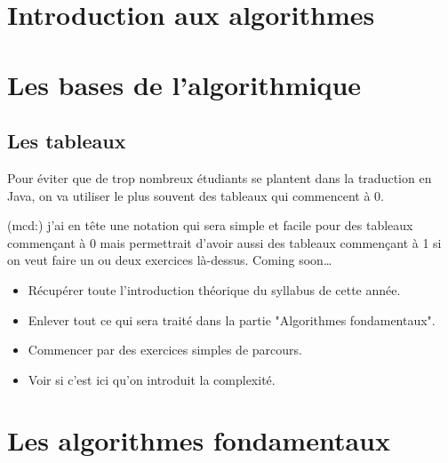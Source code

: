 \documentclass[a4paper,doubleside]{book}
\begin{document}

	
	
	

	\part{Introduction aux algorithmes}	
		
		
		

	\part{Les bases de l'algorithmique}
		
		
		
		
		
		\chapter{Les tableaux}
			\begin{Note}
				Pour éviter que de trop nombreux étudiants
				se plantent dans la traduction en Java,
				on va utiliser le plus souvent des tableaux
				qui commencent à 0.
				
				(mcd:) j'ai en tête une notation qui sera simple
				et facile pour des tableaux commençant à 0
				mais permettrait d'avoir aussi des tableaux
				commençant à 1 si on veut faire un ou deux exercices
				là-dessus. Coming soon\dots 
			\end{Note}
			
			\begin{TODO}
				\begin{itemize}
				\item
					Récupérer toute l'introduction théorique
					du syllabus de cette année.
				\item
					Enlever tout ce qui sera traité dans la partie
					"Algorithmes fondamentaux".
				\item
					Commencer par des exercices simples de parcours.
				\item
					Voir si c'est ici qu'on introduit la complexité.
				\end{itemize}
			\end{TODO}

	\part{Les algorithmes fondamentaux}
\end{document}
